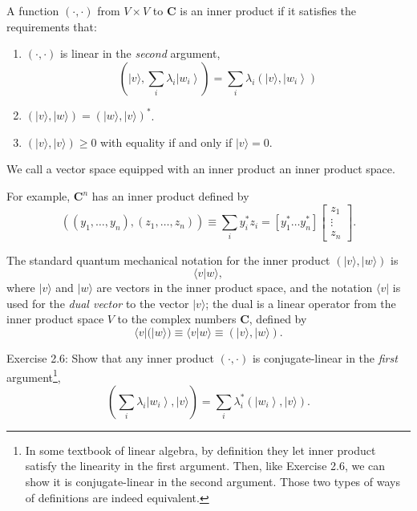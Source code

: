 


A function $(\cdot, \cdot)$ from $V \times V$ to $\mathbf{C}$ is an inner product if it satisfies the requirements that:
\begin{enumerate}
    \item $(\cdot, \cdot)$ is linear in the \textit{second} argument, 
$$
\left(|v\rangle, \sum_{i} \lambda_{i}\left|w_{i}\right\rangle\right)=\sum_{i} \lambda_{i}\left(|v\rangle,\left|w_{i}\right\rangle\right)
$$
    \item $(|v\rangle,|w\rangle)=(|w\rangle,|v\rangle)^{*}$.
    \item $(|v\rangle,|v\rangle) \geq 0$ with equality if and only if $|v\rangle=0$.
\end{enumerate}
We call a vector space equipped with an inner product an inner product space.

\begin{example}
    For example, $\mathbf{C}^{n}$ has an inner product defined by
$$
\left(\left(y_{1}, \ldots, y_{n}\right),\left(z_{1}, \ldots, z_{n}\right)\right) \equiv \sum_{i} y_{i}^{*} z_{i}=\left[y_{1}^{*} \ldots y_{n}^{*}\right]\left[\begin{array}{c}
z_{1} \\
\vdots \\
z_{n}
\end{array}\right].
$$
\end{example}

The standard quantum mechanical notation for the inner product $(|v\rangle,|w\rangle)$ is $$\langle v | w\rangle,$$where $|v\rangle$ and $|w\rangle$ are vectors in the inner product space, and the notation $\langle v|$ is used for the \textit{dual vector} to the vector $|v\rangle$; the dual is a linear operator from the inner product space $V$ to the complex numbers $\mathbf{C}$, defined by
$$
\langle v|(|w\rangle) \equiv\langle v | w\rangle \equiv(|v\rangle,|w\rangle).
$$


\begin{exercise}
    Exercise 2.6: Show that any inner product $(\cdot, \cdot)$ is conjugate-linear in the \textit{first} argument\footnote{In some textbook of linear algebra, by definition they let inner product satisfy the linearity in the first argument. Then, like Exercise 2.6, we can show it is conjugate-linear in the second argument. Those two types of ways of definitions are indeed equivalent. },
$$
\left(\sum_{i} \lambda_{i}\left|w_{i}\right\rangle,|v\rangle\right)=\sum_{i} \lambda_{i}^{*}\left(\left|w_{i}\right\rangle,|v\rangle\right) .
$$
\end{exercise}


